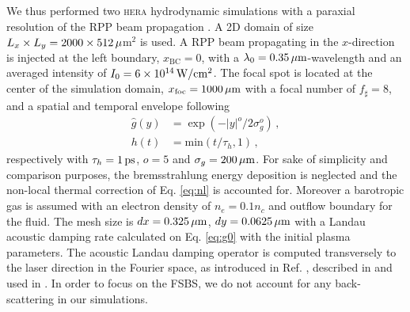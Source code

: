 \documentclass[
 reprint,
 superscriptaddress,
 amsmath,amssymb,
 aps,
]{revtex4-1}
\begin{document}
We thus performed two \textsc{hera} hydrodynamic simulations with a paraxial resolution of the RPP beam propagation \cite[]{Loiseau_2006}. 
A 2D domain of size $L_x \times L_y = 2000 \times 512\, \rm \mu$m$^2$ is used. 
A RPP beam  propagating in the $x$-direction is injected at the left boundary, $x_\mathrm{BC}=0$, with a  $\lambda_0=0.35\, \rm\mu m$-wavelength and an averaged intensity of $I_0=6\times 10^{14}\, \rm W/cm^2$.
The focal spot is located at the center of the simulation domain, $x_\mathrm{foc}=1000\, \rm \mu m$ with a focal number of $f_\sharp = 8$, and
a spatial and temporal envelope following
\begin{align}
    \hat{g}(y) &= \exp(-\vert y\vert ^o/2\sigma_g^o)  \, ,  \label{eq:g}\\
    h(t) &= \mathrm{min}(t/\tau_h,1) \, ,\label{eq:h}
\end{align}
respectively with $\tau_h=1\, \rm ps$,  $o=5$ and $\sigma_g = 200\,\rm \mu m$. 
For sake of simplicity and comparison purposes, the bremsstrahlung energy deposition is neglected and the non-local thermal correction of Eq. \eqref{eq:nl} is accounted for.  
Moreover a barotropic gas is assumed  with an electron density of $n_e =0.1n_c $ and outflow boundary for the fluid.
The mesh size is $dx =0.325\,\rm \mu m$, $dy = 0.0625\, \rm \mu m$
with a Landau acoustic damping rate calculated on  Eq. \eqref{eq:g0} with the initial plasma parameters. 
The acoustic Landau damping operator is computed transversely to the laser direction in the Fourier space, as introduced in Ref. \cite[]{POP_Rose_96}, described in \cite[]{Berger_98} and used in   \cite{phd-PEML,Masson_2006,Huller_2008}.
In order to focus on the FSBS, we do not account for any back-scattering in our simulations. 
\end{document}
